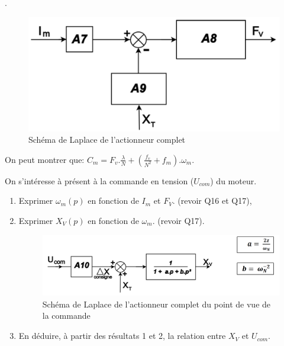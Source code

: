 .

\begin{figure}[!h]
 \centering\includegraphics[width=0.4\linewidth]{img/fig21}
 \caption{Schéma de Laplace de l'actionneur complet}
 \label{img21}
\end{figure}


On peut montrer que: $C_m=F_v.\frac{\lambda}{N}+\left(\frac{f_v}{N^2}+f_m\right).\omega_m$.


On s'intéresse à présent à la commande en tension ($U_{com}$) du moteur.


\begin{enumerate}
 \item Exprimer $\omega_m(p)$ en fonction de $I_m$ et $F_V$. (revoir Q16 et Q17),
 \item Exprimer $X_V(p)$ en fonction de $\omega_m$. (revoir Q17).

\begin{figure}[!h]
 \centering\includegraphics[width=0.7\linewidth]{img/fig22}
 \caption{Schéma de Laplace de l'actionneur complet du point de vue de la commande}
 \label{img22}
\end{figure}
 \item En déduire, à partir des résultats 1 et 2, la relation entre $X_V$ et $U_{com}$.
\end{enumerate}


